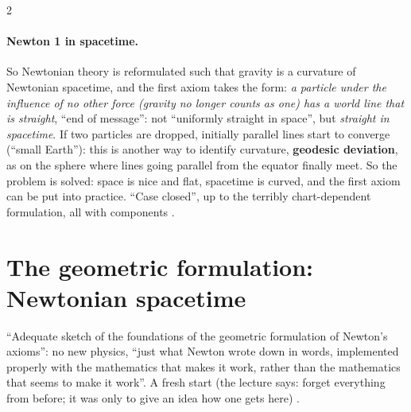\begin{paracol}{2}
\paragraph{Newton 1 in spacetime.} So Newtonian theory is reformulated such that gravity is a curvature of Newtonian spacetime, and the first axiom takes the form: \emph{a particle under the influence of no other force (gravity no longer counts as one) has a world line that is straight}, ``end of message'': not ``uniformly straight in space'', but \emph{straight in spacetime}. If two particles are dropped, initially parallel lines start to converge (``small Earth''): this is another way to identify curvature, \textbf{geodesic deviation}, as on the sphere where lines going parallel from the equator finally meet. So the problem is solved: space is nice and flat, spacetime is curved, and the first axiom can be put into practice. ``Case closed'', up to the terribly chart-dependent formulation, all with components .

\section{The geometric formulation: Newtonian spacetime}\label{sec:c09-geometric}

``Adequate sketch of the foundations of the geometric formulation of Newton's axioms'': no new physics, ``just what Newton wrote down in words, implemented properly with the mathematics that makes it work, rather than the mathematics that seems to make it work''. A fresh start (the lecture says: forget everything from before; it was only to give an idea how one gets here) .


\end{paracol}
